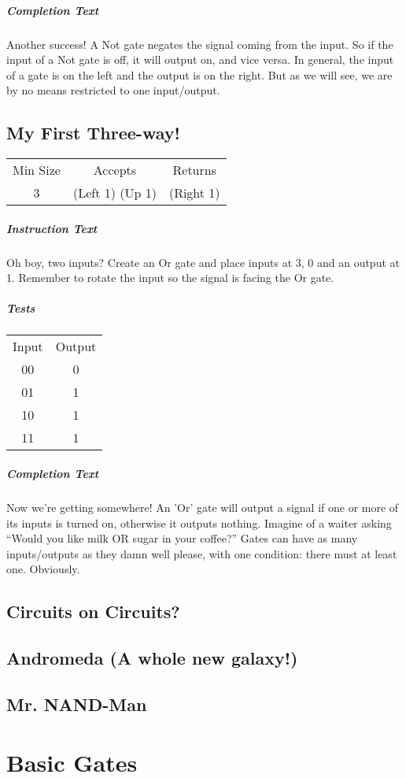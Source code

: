 ﻿\documentclass[a4paper, 12pt]{article}
\begin{document}
\subparagraph{Completion Text}
Another success! A Not gate negates the signal coming from the input. So if the input of a Not gate is off, it will output on, and vice versa. In general, the input of a gate is on the left and the output is on the right. But as we will see, we are by no means restricted to one input/output.

\subsection{My First Three-way!}
\begin{tabular}{ccc}
	Min Size & Accepts & Returns \\ 
	3 & (Left 1) (Up 1) & (Right 1)
\end{tabular}

\subparagraph{Instruction Text}
Oh boy, two inputs? Create an Or gate and place inputs at 3, 0 and an output at 1. Remember to rotate the input so the signal is facing the Or gate.

\subparagraph{Tests}
\begin{tabular}{cc}
	Input & Output  \\
	00 & 0 \\
	01 & 1 \\
	10 & 1 \\
	11 & 1
\end{tabular}

\subparagraph{Completion Text}		
Now we're getting somewhere! An 'Or' gate will output a signal if one or more of its inputs is turned on, otherwise it outputs nothing. Imagine of a waiter asking “Would you like milk OR sugar in your coffee?” Gates can have as many inputs/outputs as they damn well please, with one condition: there must at least one. Obviously.

\subsection{Circuits on Circuits?}

\subsection{Andromeda (A whole new galaxy!)}

\subsection{Mr. NAND-Man}

\section{Basic Gates}
\end{document}
